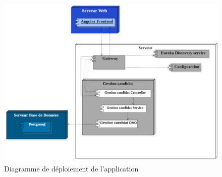 \begin{figure}[H]
     \centering
     \includegraphics[scale=0.5]{img/DeploymentDiagram1.png}
     \caption{Diagramme de déploiement de l'application}
     \label{fig:diagram_deploiement}
 \end{figure}
